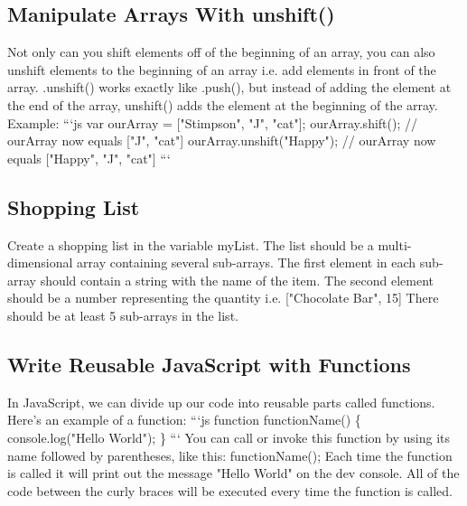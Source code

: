 \documentclass{article}%
\begin{document}
\subsection{Manipulate Arrays With unshift()}%
\label{subsec:ManipulateArraysWithunshift()}%
Not only can you shift elements off of the beginning of an array, you can also unshift elements to the beginning of an array i.e. add elements in front of the array.\newline%
.unshift() works exactly like .push(), but instead of adding the element at the end of the array, unshift() adds the element at the beginning of the array.\newline%
Example:\newline%
```js\newline%
var ourArray = {[}"Stimpson", "J", "cat"{]};\newline%
ourArray.shift(); // ourArray now equals {[}"J", "cat"{]}\newline%
ourArray.unshift("Happy");\newline%
// ourArray now equals {[}"Happy", "J", "cat"{]}\newline%
```\newline%

%
\subsection{Shopping List}%
\label{subsec:ShoppingList}%
Create a shopping list in the variable myList. The list should be a multi{-}dimensional array containing several sub{-}arrays.\newline%
The first element in each sub{-}array should contain a string with the name of the item. The second element should be a number representing the quantity i.e.\newline%
{[}"Chocolate Bar", 15{]}\newline%
There should be at least 5 sub{-}arrays in the list.\newline%

%
\subsection{Write Reusable JavaScript with Functions}%
\label{subsec:WriteReusableJavaScriptwithFunctions}%
In JavaScript, we can divide up our code into reusable parts called functions.\newline%
Here's an example of a function:\newline%
```js\newline%
function functionName() \{\newline%
  console.log("Hello World");\newline%
\}\newline%
```\newline%
You can call or invoke this function by using its name followed by parentheses, like this:\newline%
functionName();\newline%
Each time the function is called it will print out the message "Hello World" on the dev console. All of the code between the curly braces will be executed every time the function is called.\newline%
\end{document}
